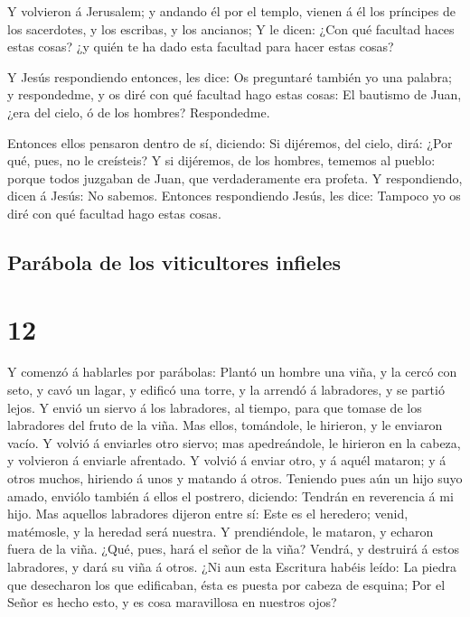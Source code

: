  Y volvieron á Jerusalem; y andando él por el templo,
vienen á él los príncipes de los sacerdotes, y los escribas, y los
ancianos;  Y le dicen: ¿Con qué facultad haces estas
cosas? ¿y quién te ha dado esta facultad para hacer estas cosas?

 Y Jesús respondiendo entonces, les dice: Os preguntaré
también yo una palabra; y respondedme, y os diré con qué facultad hago
estas cosas:  El bautismo de Juan, ¿era del cielo, ó de
los hombres? Respondedme.

 Entonces ellos pensaron dentro de sí, diciendo: Si
dijéremos, del cielo, dirá: ¿Por qué, pues, no le creísteis?
 Y si dijéremos, de los hombres, tememos al pueblo:
porque todos juzgaban de Juan, que verdaderamente era profeta.
 Y respondiendo, dicen á Jesús: No sabemos. Entonces
respondiendo Jesús, les dice: Tampoco yo os diré con qué facultad hago
estas cosas.

\hypertarget{paruxe1bola-de-los-viticultores-infieles}{%
\subsection{Parábola de los viticultores
infieles}\label{paruxe1bola-de-los-viticultores-infieles}}

\hypertarget{section-11}{%
\section{12}\label{section-11}}

 Y comenzó á hablarles por parábolas: Plantó un hombre una
viña, y la cercó con seto, y cavó un lagar, y edificó una torre, y la
arrendó á labradores, y se partió lejos.  Y envió un
siervo á los labradores, al tiempo, para que tomase de los labradores
del fruto de la viña.  Mas ellos, tomándole, le hirieron,
y le enviaron vacío.  Y volvió á enviarles otro siervo;
mas apedreándole, le hirieron en la cabeza, y volvieron á enviarle
afrentado.  Y volvió á enviar otro, y á aquél mataron; y á
otros muchos, hiriendo á unos y matando á otros.  Teniendo
pues aún un hijo suyo amado, enviólo también á ellos el postrero,
diciendo: Tendrán en reverencia á mi hijo.  Mas aquellos
labradores dijeron entre sí: Este es el heredero; venid, matémosle, y la
heredad será nuestra.  Y prendiéndole, le mataron, y
echaron fuera de la viña.  ¿Qué, pues, hará el señor de la
viña? Vendrá, y destruirá á estos labradores, y dará su viña á otros.
 ¿Ni aun esta Escritura habéis leído: La piedra que
desecharon los que edificaban, ésta es puesta por cabeza de esquina;
 Por el Señor es hecho esto, y es cosa maravillosa en
nuestros ojos?

